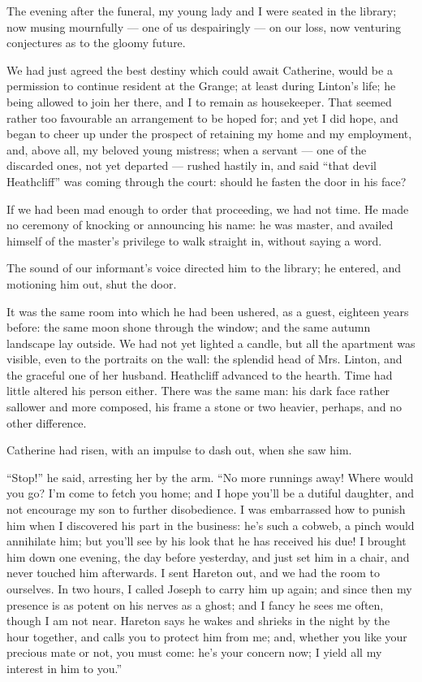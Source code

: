 \par The evening after the funeral, my young lady and I were seated in the library; now musing mournfully — one of us despairingly — on our loss, now venturing conjectures as to the gloomy future.
\par We had just agreed the best destiny which could await Catherine, would be a permission to continue resident at the Grange; at least during Linton's life; he being allowed to join her there, and I to remain as housekeeper. That seemed rather too favourable an arrangement to be hoped for; and yet I did hope, and began to cheer up under the prospect of retaining my home and my employment, and, above all, my beloved young mistress; when a servant — one of the discarded ones, not yet departed — rushed hastily in, and said “that devil Heathcliff” was coming through the court: should he fasten the door in his face?
\par If we had been mad enough to order that proceeding, we had not time. He made no ceremony of knocking or announcing his name: he was master, and availed himself of the master's privilege to walk straight in, without saying a word.
\par The sound of our informant's voice directed him to the library; he entered, and motioning him out, shut the door.
\par It was the same room into which he had been ushered, as a guest, eighteen years before: the same moon shone through the window; and the same autumn landscape lay outside. We had not yet lighted a candle, but all the apartment was visible, even to the portraits on the wall: the splendid head of Mrs. Linton, and the graceful one of her husband. Heathcliff advanced to the hearth. Time had little altered his person either. There was the same man: his dark face rather sallower and more composed, his frame a stone or two heavier, perhaps, and no other difference.
\par Catherine had risen, with an impulse to dash out, when she saw him.
\par “Stop!” he said, arresting her by the arm. “No more runnings away! Where would you go? I'm come to fetch you home; and I hope you'll be a dutiful daughter, and not encourage my son to further disobedience. I was embarrassed how to punish him when I discovered his part in the business: he's such a cobweb, a pinch would annihilate him; but you'll see by his look that he has received his due! I brought him down one evening, the day before yesterday, and just set him in a chair, and never touched him afterwards. I sent Hareton out, and we had the room to ourselves. In two hours, I called Joseph to carry him up again; and since then my presence is as potent on his nerves as a ghost; and I fancy he sees me often, though I am not near. Hareton says he wakes and shrieks in the night by the hour together, and calls you to protect him from me; and, whether you like your precious mate or not, you must come: he's your concern now; I yield all my interest in him to you.”
